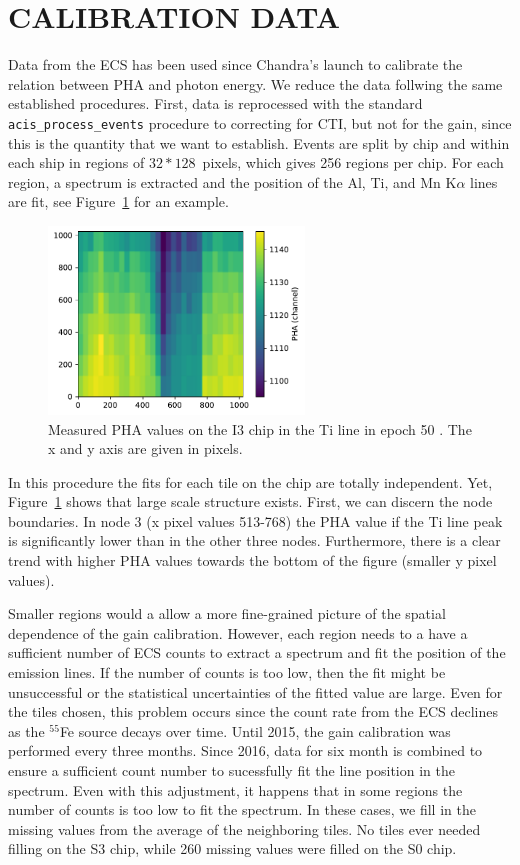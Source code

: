 \documentclass[]{spie}  %
\begin{document}
\section{CALIBRATION DATA}
Data from the ECS has been used since Chandra's launch to calibrate the relation between PHA and photon energy. We reduce the data follwing the same established procedures. First, data is reprocessed with the standard \texttt{acis\_process\_events} procedure to correcting for CTI, but not for the gain, since this is the quantity that we want to establish. Events are split by chip and within each ship in regions of $32*128$~pixels, which gives 256 regions per chip. For each region, a spectrum is extracted and the position of the Al, Ti, and Mn K$\alpha$ lines are fit, see Figure~\ref{fig:example} for an example.
\begin{figure} [ht]
  \begin{center}
    \includegraphics[height=5cm]{figures/i1e50Ti.pdf}
  \end{center}
  \caption
      {Measured PHA values on the I3 chip in the Ti line in epoch 50 \label{fig:example}. The x and y axis are given in pixels.
}
\end{figure}
In this procedure the fits for each tile on the chip are totally independent. Yet, Figure~\ref{fig:example} shows that large scale structure exists. First, we can discern the node boundaries. In node 3 (x pixel values 513-768) the PHA value if the Ti line peak is significantly lower than in the other three nodes. Furthermore, there is a clear trend with higher PHA values towards the bottom of the figure (smaller y pixel values).

Smaller regions would a allow a more fine-grained picture of the spatial dependence of the gain calibration. However, each region needs to a have a sufficient number of ECS counts to extract a spectrum and fit the position of the emission lines. If the number of counts is too low, then the fit might be unsuccessful or the statistical uncertainties of the fitted value are large. Even for the tiles chosen, this problem occurs since the count rate from the ECS declines as the $^{55}$Fe source decays over time. Until 2015, the gain calibration was performed every three months. Since 2016, data for six month is combined to ensure a sufficient count number to sucessfully fit the line position in the spectrum. Even with this adjustment, it happens that in some regions the number of counts is too low to fit the spectrum. In these cases, we fill in the missing values from the average of the neighboring tiles. No tiles ever needed filling on the S3 chip, while 260 missing values were filled on the S0 chip.
\end{document}
